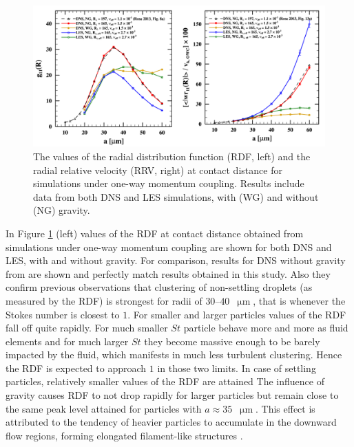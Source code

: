 \documentclass{pracamgren}
\begin{document}
\begin{figure}[ht]
\centering
\includegraphics[width=13.5cm]{figures/2-06_owcrdfrrv.pdf}
\caption{
The values of the radial distribution function (RDF, left) and the radial relative velocity (RRV, right) at contact distance for simulations under one-way momentum coupling.
Results include data from both DNS and LES simulations, with (WG) and without (NG) gravity.
}
\label{fig:owcrdfrrv}
\end{figure}

In Figure \ref{fig:owcrdfrrv} (left) values of the RDF at contact distance obtained from simulations under one-way momentum coupling are shown for both DNS and LES, with and without gravity.
For comparison, results for DNS without gravity from \textcite{Rosa2013} are shown and perfectly match results obtained in this study.
Also they confirm previous observations that clustering of non-settling droplets (as measured by the RDF) is strongest for radii of $30$--$40$~$\upmu\text{m}$, that is whenever the Stokes number is closest to $1$.
For smaller and larger particles values of the RDF fall off quite rapidly.
For much smaller $St$ particle behave more and more as fluid elements and for much larger $St$ they become massive enough to be barely impacted by the fluid, which manifests in much less turbulent clustering.
Hence the RDF is expected to approach $1$ in those two limits.
In case of settling particles, relatively smaller values of the RDF are attained
The influence of gravity causes RDF to not drop rapidly for larger particles but remain close to the same peak level attained for particles with $a \approx 35$~$\upmu\text{m}$. 
This effect is attributed to the tendency of heavier particles to accumulate in the downward flow regions, forming elongated filament-like structures \parencite{Rosa2015}. 
\end{document}
